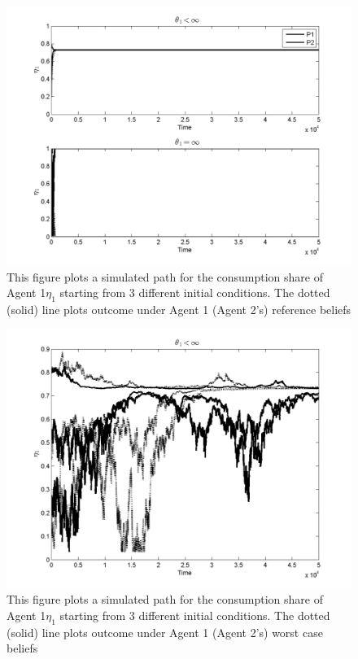 \documentclass[12pt]{article}
\begin{document}
\begin{figure}[htbp]
\centering
	  \includegraphics[scale=0.4]{Matlab/InfiniteHorizon/Survival/Graphs/Agent1ConsumptionShareLongSample.png}
	  \caption{ This figure plots a simulated path for the consumption share of Agent 1$\eta_1$ starting from 3 different initial conditions. The dotted (solid) line plots outcome under Agent 1 (Agent 2's) reference beliefs }	  
\label{fig:Agent1ConsumptionShareLongSample}
\end{figure}


\begin{figure}[htbp]
\centering
	  \includegraphics[scale=0.4]{Matlab/InfiniteHorizon/Survival/Graphs/Agent1ConsumptionShareLongSampleDist.png}
	  \caption{ This figure plots a simulated path for the consumption share of Agent 1$\eta_1$ starting from 3 different initial conditions. The dotted (solid) line plots outcome under Agent 1 (Agent 2's) worst case beliefs}	  
\label{fig:Agent1ConsumptionShareLongSampleDist}
\end{figure}
\end{document}
